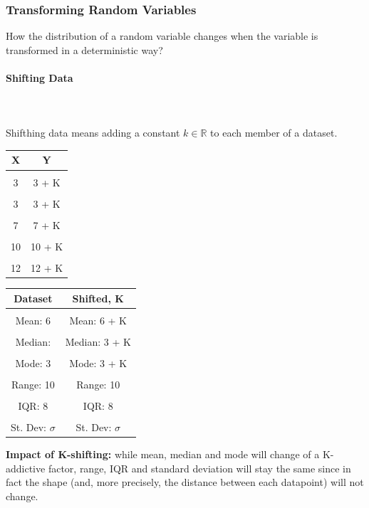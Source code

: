 \documentclass{article}
\begin{document}
\subsubsection{Transforming Random Variables}
How the distribution of a random variable changes when the variable is transformed in a deterministic way?

\paragraph{Shifting Data}\mbox{} \\
\mbox{} \\
Shifthing data means adding a constant $k \in \mathbb{R}$ to each member of a dataset.
\begin{center}
\begin{tabular}{|c|c|}
\hline
X & Y\\ \hline
&\\[-1em]
3 & 3 + K \\ \hline
&\\[-1em]
3 & 3 + K \\ \hline
&\\[-1em]
7 & 7 + K \\ \hline
&\\[-1em]
10 & 10 + K \\ \hline
&\\[-1em]
12 & 12 + K \\ 
\hline
\end{tabular}
\end{center}

\begin{center}
\begin{tabular}{|c|c|}
\hline
Dataset & Shifted, K\\ \hline
&\\[-1em]
Mean: 6 & Mean: 6 + K \\ \hline
&\\[-1em]
Median:  & Median: 3 + K \\ \hline
&\\[-1em]
Mode: 3 & Mode: 3 + K  \\ \hline
&\\[-1em]
Range: 10 & Range: 10 \\ \hline
&\\[-1em]
IQR: 8 & IQR: 8 \\ \hline
&\\[-1em]
St. Dev: $\sigma$ & St. Dev: $\sigma$ \\ 
\hline
\end{tabular}
\end{center}
\textbf{Impact of K-shifting:} while mean, median and mode will change of a K-addictive factor, range, IQR and standard deviation will stay the same since in fact the shape (and, more precisely, the distance between each datapoint) will not change.
\end{document}

